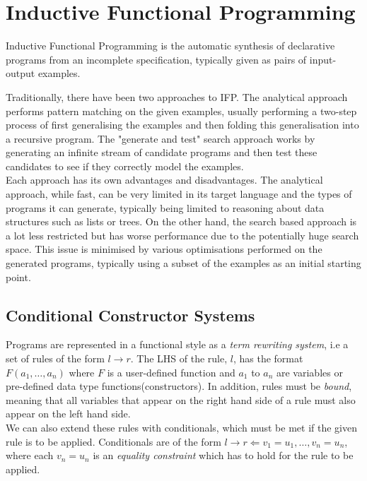\section{Inductive Functional Programming}

Inductive Functional Programming is the automatic synthesis of declarative programs from an incomplete specification, typically given as pairs of input-output examples.

Traditionally, there have been two approaches to IFP. The analytical approach performs pattern matching on the given examples, usually performing a two-step process of first generalising the examples and then folding this generalisation into a recursive program. The "generate and test" search approach works by generating an infinite stream of candidate programs and then test these candidates to see if they correctly model the examples. \\

Each approach has its own advantages and disadvantages. The analytical approach, while fast, can be very limited in its target language and the types of programs it can generate, typically being limited to reasoning about data structures such as lists or trees. On the other hand, the search based approach is a lot less restricted but has worse performance due to the potentially huge search space. This issue is minimised by various optimisations performed on the generated programs, typically using a subset of the examples as an initial starting point.

\subsection{Conditional Constructor Systems}

Programs are represented in a functional style as a \textit{term rewriting system}, i.e a set of rules of the form $l \rightarrow r$. The LHS of the rule, $l$, has the format $F(a_1, \dots, a_n)$ where $F$ is a user-defined function and $a_1$ to $a_n$ are variables or pre-defined data type functions(constructors). In addition, rules must be \textit{bound}, meaning that all variables that appear on the right hand side of a rule must also appear on the left hand side.\\

We can also extend these rules with conditionals, which must be met if the given rule is to be applied. Conditionals are of the form $l \rightarrow r \Leftarrow v_1 = u_1, \dots, v_n = u_n$, where each $v_n = u_n$ is an \textit{equality constraint} which has to hold for the rule to be applied.

